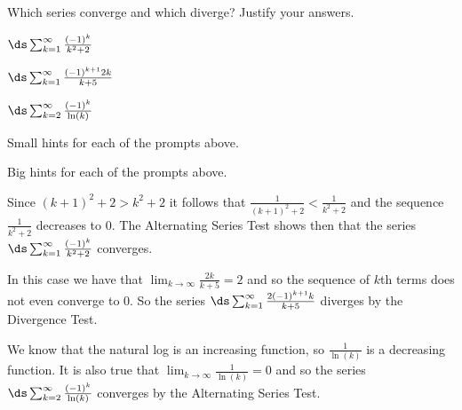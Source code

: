 \begin{activity} \label{8.4.Act2}  Which series converge and which diverge? Justify your answers.
\ba
\item $\ds \sum_{k=1}^{\infty} \frac{(-1)^k}{k^2+2}$
\item $\ds \sum_{k=1}^{\infty} \frac{(-1)^{k+1}2k}{k+5}$
\item $\ds \sum_{k=2}^{\infty} \frac{(-1)^{k}}{\ln(k)}$
\ea
\end{activity}

\begin{smallhint}
\ba
	\item Small hints for each of the prompts above.
\ea
\end{smallhint}
\begin{bighint}
\ba
	\item Big hints for each of the prompts above.
\ea
\end{bighint}
\begin{activitySolution}
\ba
	\item Since $(k+1)^2 + 2 > k^2+2$ it follows that $\frac{1}{(k+1)^2+2} < \frac{1}{k^2+2}$ and the sequence $\frac{1}{k^2+2}$ decreases to 0. The Alternating Series Test shows then that the series $\ds \sum_{k=1}^{\infty} \frac{(-1)^k}{k^2+2}$ converges. 
    \item In this case we have that $\lim_{k \to \infty} \frac{2k}{k+5} = 2$ and so the sequence of $k$th terms does not even converge to 0. So the series $\ds \sum_{k=1}^{\infty} \frac{2(-1)^{k+1}k}{k+5}$ diverges by the Divergence Test. 
    \item We know that the natural log is an increasing function, so $\frac{1}{\ln(k)}$ is a decreasing function. It is also true that $\lim_{k \to \infty} \frac{1}{\ln(k)} = 0$ and so the series $\ds \sum_{k=2}^{\infty} \frac{(-1)^{k}}{\ln(k)}$ converges by the Alternating Series Test. 
\ea
\end{activitySolution}
\aftera 
